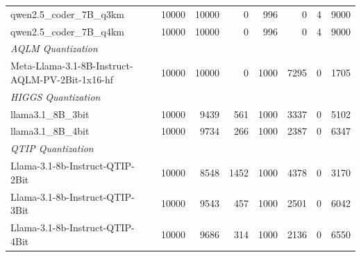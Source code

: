 \begin{table}[htbp]
{\begin{tabular}{lrrrrrrr}
    qwen2.5\_coder\_7B\_q3km & 10000 & 10000 & 0 & 996 & 0 & 4 & 9000 \\
    qwen2.5\_coder\_7B\_q4km & 10000 & 10000 & 0 & 996 & 0 & 4 & 9000 \\
    \midrule
    \multicolumn{8}{l}{\textit{AQLM Quantization}} \\
    \midrule
    Meta-Llama-3.1-8B-Instruct-AQLM-PV-2Bit-1x16-hf & 10000 & 10000 & 0 & 1000 & 7295 & 0 & 1705 \\
    \midrule
    \multicolumn{8}{l}{\textit{HIGGS Quantization}} \\
    \midrule
    llama3.1\_8B\_3bit & 10000 & 9439 & 561 & 1000 & 3337 & 0 & 5102 \\
    llama3.1\_8B\_4bit & 10000 & 9734 & 266 & 1000 & 2387 & 0 & 6347 \\
    \midrule
    \multicolumn{8}{l}{\textit{QTIP Quantization}} \\
    \midrule
    Llama-3.1-8b-Instruct-QTIP-2Bit & 10000 & 8548 & 1452 & 1000 & 4378 & 0 & 3170 \\
    Llama-3.1-8b-Instruct-QTIP-3Bit & 10000 & 9543 & 457 & 1000 & 2501 & 0 & 6042 \\
    Llama-3.1-8b-Instruct-QTIP-4Bit & 10000 & 9686 & 314 & 1000 & 2136 & 0 & 6550 \\
    \bottomrule
  \end{tabular}
  }
\end{table}

